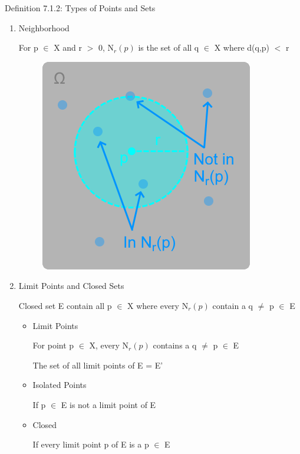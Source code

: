 { \color{blue} Definition 7.1.2: Types of Points and Sets } 
	\begin{enumerate}[label=(\alph*), leftmargin=2cm, itemsep=0.1cm]
		\item {\color{lblue} Neighborhood}

			\qquad For p $\in$ X and r $>$ 0, N$_r(p)$ is the set of all q $\in$ X
			where d(q,p) $<$ r

			\begin{figure}[h]
				\centering
				\includegraphics[scale=0.45]{Images/7.1.2a.png}
			\end{figure}

		\item {\color{lblue} Limit Points and Closed Sets}

			\hspace{0.1cm} Closed set E contain all p $\in$ X where every N$_r(p)$ contain
			a q $\neq$ p $\in$ E

			\begin{itemize}[leftmargin=1cm, itemsep=0.1cm]
				\item Limit Points 

					\qquad For point p $\in$ X, every N$_r(p)$ contains a
					q $\neq$ p $\in$ E

					\qquad The set of all limit points of E = E'
				
				\item Isolated Points

					\qquad If p $\in$ E is not a limit point of E

				\item Closed

					\qquad If every limit point p of E is a p $\in$ E
			\end{itemize}


\end{enumerate}

